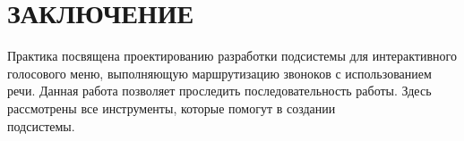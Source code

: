 \chapter{ЗАКЛЮЧЕНИЕ}

Практика посвящена проектированию разработки подсистемы для интерактивного
голосового меню, выполняющую маршрутизацию звоноков с использованием речи.
Данная работа позволяет проследить последовательность работы.
Здесь рассмотрены все инструменты, которые помогут в создании  \\ \mbox{подсистемы}.
